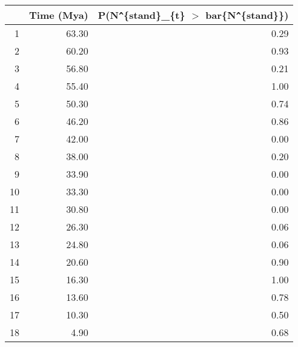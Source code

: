 \begin{table}[ht]
\centering
\begin{tabular}{rrr}
  \hline
 & Time (Mya) & P(N\verb|^|\{stand\}\_\{t\} $>$ bar\{N\verb|^|\{stand\}\}) \\ 
  \hline
1 & 63.30 & 0.29 \\ 
  2 & 60.20 & 0.93 \\ 
  3 & 56.80 & 0.21 \\ 
  4 & 55.40 & 1.00 \\ 
  5 & 50.30 & 0.74 \\ 
  6 & 46.20 & 0.86 \\ 
  7 & 42.00 & 0.00 \\ 
  8 & 38.00 & 0.20 \\ 
  9 & 33.90 & 0.00 \\ 
  10 & 33.30 & 0.00 \\ 
  11 & 30.80 & 0.00 \\ 
  12 & 26.30 & 0.06 \\ 
  13 & 24.80 & 0.06 \\ 
  14 & 20.60 & 0.90 \\ 
  15 & 16.30 & 1.00 \\ 
  16 & 13.60 & 0.78 \\ 
  17 & 10.30 & 0.50 \\ 
  18 & 4.90 & 0.68 \\ 
   \hline
\end{tabular}
\label{tab:div_peak}
\end{table}
